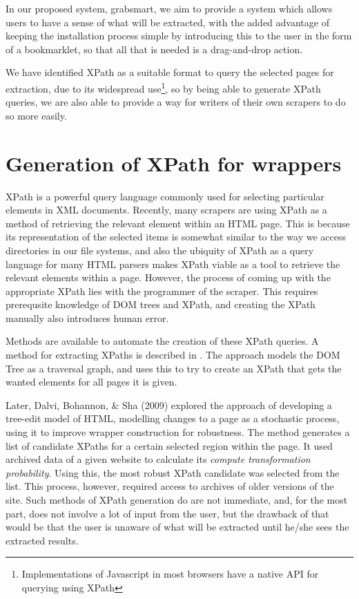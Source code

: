 In our proposed system, grabsmart, we aim to provide a system which allows users to have a
sense of what will be extracted, with the added advantage of keeping the installation process
simple by introducing this to the user in the form of a bookmarklet, so that all that is needed
is a drag-and-drop action.

We have identified XPath as a suitable format to query the selected pages for extraction,
due to its widespread use\footnote{Implementations of Javascript in most browsers have
a native API for querying using XPath}, so by being able to generate XPath queries,
we are also able to provide a way for writers of their own scrapers to do so more easily.


\section{Generation of XPath for wrappers}
XPath is a powerful query language commonly used for selecting particular elements in XML
documents. Recently, many scrapers are using XPath as a method of retrieving the relevant
element within an HTML page. This is because its representation of the selected items is
somewhat similar to the way we access directories in our file systems, and also the ubiquity of
XPath as a query language for many HTML parsers makes XPath viable as a tool to retrieve the
relevant elements within a page. However, the process of coming up with the appropriate XPath
lies with the programmer of the scraper. This requires prerequsite knowledge of DOM trees and
XPath, and creating the XPath manually also introduces human error.
	
Methods are available to automate the creation of these XPath queries. A method for extracting
XPaths is described in \cite{Anton2004}. The approach models the DOM Tree as a traversal graph,
and uses this to try to create an XPath that gets the wanted elements for all pages it is given.

Later,  Dalvi, Bohannon, \& Sha (2009) explored the approach of developing a tree-edit model of HTML,
modelling changes to a page as a stochastic process, using it to improve wrapper construction
for robustness. The method generates a list of candidate XPaths for a certain selected region
within the page. It used archived data of a given website to calculate its \textit{compute
transformation probability}. Using this, the most robust XPath candidate was selected from the
list. This process, however, required access to archives of older versions of the site. Such
methods of XPath generation do are not immediate, and, for the most part, does not involve a
lot of input from the user, but the drawback of that would be that the user is unaware of what
will be extracted until he/she sees the extracted results.

